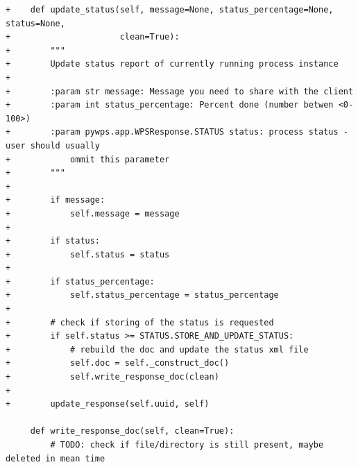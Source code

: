 \documentclass[12pt,a4paper]{article}
\begin{document}
\begin{lstlisting}[basicstyle=\small,caption={pywps diff file}]
+    def update_status(self, message=None, status_percentage=None, status=None,
+                      clean=True):
+        """
+        Update status report of currently running process instance
+
+        :param str message: Message you need to share with the client
+        :param int status_percentage: Percent done (number betwen <0-100>)
+        :param pywps.app.WPSResponse.STATUS status: process status - user should usually
+            ommit this parameter
+        """
+
+        if message:
+            self.message = message
+
+        if status:
+            self.status = status
+
+        if status_percentage:
+            self.status_percentage = status_percentage
+
+        # check if storing of the status is requested
+        if self.status >= STATUS.STORE_AND_UPDATE_STATUS:
+            # rebuild the doc and update the status xml file
+            self.doc = self._construct_doc()
+            self.write_response_doc(clean)
+
+        update_response(self.uuid, self)
 
     def write_response_doc(self, clean=True):
         # TODO: check if file/directory is still present, maybe deleted in mean time
\end{lstlisting}

\newpage
\end{document}
